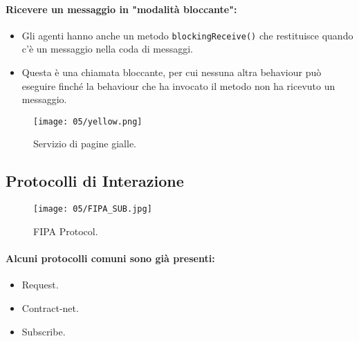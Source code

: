 \paragraph{Ricevere un messaggio in "modalità bloccante":}

\begin{itemize}
  \item Gli agenti hanno anche un metodo \texttt{blockingReceive()} che restituisce quando c'è un messaggio nella coda di messaggi.
  \item Questa è una chiamata bloccante, per cui nessuna altra behaviour può eseguire finché la behaviour che ha invocato il metodo non ha ricevuto un messaggio.
\end{itemize}



\begin{figure}[!h]
    \centering
    \texttt{[image: 05/yellow.png]}
  \caption{Servizio di pagine gialle.}
\end{figure}

\pagebreak

\subsection{Protocolli di Interazione}


\begin{figure}[!h]
    \centering
    \texttt{[image: 05/FIPA\_SUB.jpg]}
  \caption{FIPA Protocol.}
\end{figure}

\paragraph{Alcuni protocolli comuni sono già presenti:}

\begin{itemize}
  \item Request. 
  \item Contract-net. 
  \item Subscribe.
\end{itemize}

